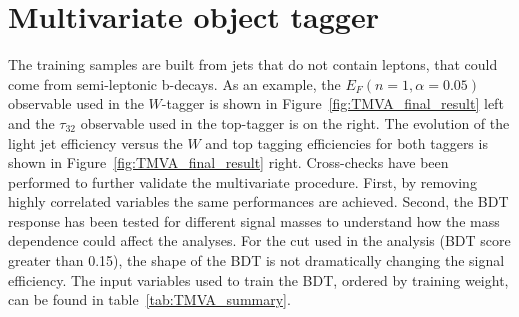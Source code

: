 \section{Multivariate object tagger}%
\label{sec:app:mva}
The training samples are built from jets that do not contain leptons, that could come from semi-leptonic b-decays. As an example, the $E_{F}(n=1,\alpha=0.05)$ observable used in the $W$-tagger is shown in Figure~\ref{fig:TMVA_final_result} left and the $\tau_{32}$ observable used in the top-tagger is on the right. The evolution of the light jet efficiency versus the $W$ and top tagging efficiencies for both taggers is shown in Figure~\ref{fig:TMVA_final_result} right. Cross-checks have been performed to further validate the multivariate procedure. First, by removing highly correlated variables the same performances are achieved. Second, the BDT response has been tested for different signal masses to understand how the mass dependence could affect the analyses. For the cut used in the analysis (BDT score greater than 0.15), the shape of the BDT is not dramatically changing the signal efficiency. The input variables used to train the BDT, ordered by training weight, can be found in table~\ref{tab:TMVA_summary}.

